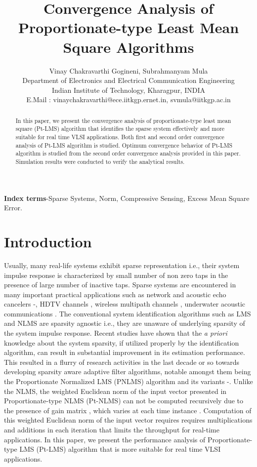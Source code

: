 \documentclass[journal, one column]{IEEEtran}
\begin{document}
\title{Convergence Analysis of Proportionate-type Least Mean Square Algorithms}


\author{{Vinay Chakravarthi Gogineni, Subrahmanyam Mula}\\
Department of Electronics and Electrical Communication Engineering\\
Indian Institute of Technology, Kharagpur, INDIA\\
E.Mail : vinaychakravarthi@ece.iitkgp.ernet.in, svmula@iitkgp.ac.in}

\maketitle
\thispagestyle{empty}

\begin{abstract}
In this paper, we present the convergence analysis of proportionate-type least mean square (Pt-LMS) algorithm that identifies the sparse system effectively and more suitable for real time VLSI applications. Both first and second order convergence analysis of Pt-LMS algorithm is studied. Optimum convergence behavior of Pt-LMS algorithm is studied from the second order convergence analysis provided in this paper. Simulation results were conducted to verify the analytical results.
\end{abstract}
\textbf{Index terms}-Sparse Systems,  Norm, Compressive Sensing, Excess Mean Square Error.
\section{Introduction}
Usually, many real-life systems exhibit sparse representation
i.e., their system impulse response is characterized by small
number of non zero taps in the presence of large number of
inactive taps. Sparse systems are encountered in many important
practical applications such as network and acoustic echo
cancelers -, HDTV channels ,
wireless multipath channels , underwater acoustic
communications . The conventional
system identification algorithms such as LMS and NLMS
are sparsity agnostic i.e., they are unaware of
underlying sparsity of the system impulse response.  Recent
studies have shown that the \emph{a priori} knowledge about the
system sparsity, if utilized properly by the identification
algorithm, can result in substantial improvement in its estimation
performance. This resulted in a flurry of research activities in
the last decade or so towards developing sparsity aware adaptive
filter algorithms, notable amongst them being the Proportionate
Normalized LMS (PNLMS) algorithm  and its variants
-. Unlike the NLMS, the weighted Euclidean norm of the input vector presented in Proportionate-type NLMS (Pt-NLMS) can not be computed recursively due to the presence of gain matrix , which varies at each time instance . Computation of this weighted Euclidean norm of the input vector requires requires  multiplications and  additions in each iteration that limits the throughput for real-time applications. In this paper, we present the performance analysis of Proportionate-type LMS (Pt-LMS) algorithm that is more suitable for real time VLSI applications.
\end{document}
